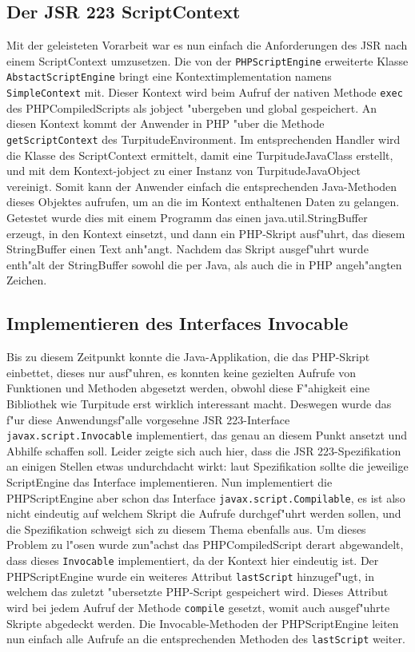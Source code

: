 \subsection{Der JSR 223 ScriptContext}
\label{sec:chap1:impl:9}

Mit der geleisteten Vorarbeit war es nun einfach die Anforderungen des JSR nach einem ScriptContext umzusetzen. Die von der \texttt{PHPScriptEngine} erweiterte Klasse
\texttt{AbstactScriptEngine} bringt eine Kontextimplementation namens \texttt{SimpleContext} mit. Dieser Kontext wird beim Aufruf der nativen Methode \texttt{exec} des PHPCompiledScripts
als jobject "ubergeben und global gespeichert. An diesen Kontext kommt der Anwender in PHP "uber die Methode \texttt{getScriptContext} des TurpitudeEnvironment. Im 
entsprechenden Handler wird die Klasse des ScriptContext ermittelt, damit eine TurpitudeJavaClass erstellt, und mit dem Kontext-jobject zu einer Instanz von
TurpitudeJavaObject vereinigt. Somit kann der Anwender einfach die entsprechenden Java-Methoden dieses Objektes aufrufen, um an die im Kontext enthaltenen Daten zu
gelangen. Getestet wurde dies mit einem Programm das einen java.util.StringBuffer erzeugt, in den Kontext einsetzt, und dann ein PHP-Skript ausf"uhrt, das diesem
StringBuffer einen Text anh"angt. Nachdem das Skript ausgef"uhrt wurde enth"alt der StringBuffer sowohl die per Java, als auch die in PHP angeh"angten Zeichen.

\subsection{Implementieren des Interfaces Invocable}
\label{sec:chap1:impl:10}

Bis zu diesem Zeitpunkt konnte die Java-Applikation, die das PHP-Skript einbettet, dieses nur ausf"uhren, es konnten keine gezielten Aufrufe von Funktionen und Methoden
abgesetzt werden, obwohl diese F"ahigkeit eine Bibliothek wie Turpitude erst wirklich interessant macht. Deswegen wurde das f"ur diese Anwendungsf"alle vorgesehne
JSR 223-Interface \texttt{javax.script.Invocable}
implementiert, das genau an diesem Punkt ansetzt und Abhilfe schaffen soll. Leider zeigte sich auch hier, dass die JSR 223-Spezifikation an einigen Stellen
etwas undurchdacht wirkt: laut Spezifikation sollte die jeweilige ScriptEngine das Interface implementieren. Nun implementiert die PHPScriptEngine aber schon
das Interface \texttt{javax.script.Compilable}, es ist also nicht eindeutig auf welchem Skript die Aufrufe durchgef"uhrt werden sollen, und die Spezifikation schweigt
sich zu diesem Thema ebenfalls aus. Um dieses Problem zu l"osen wurde zun"achst das PHPCompiledScript derart abgewandelt, dass dieses \texttt{Invocable} implementiert,
da der Kontext hier eindeutig ist. Der PHPScriptEngine wurde ein weiteres Attribut \texttt{lastScript} hinzugef"ugt, in welchem das zuletzt "ubersetzte 
PHP-Script gespeichert wird. Dieses Attribut wird bei jedem Aufruf der Methode \texttt{compile} gesetzt, womit auch ausgef"uhrte Skripte abgedeckt werden.
Die Invocable-Methoden der PHPScriptEngine leiten nun einfach alle Aufrufe an die entsprechenden Methoden des \texttt{lastScript} weiter.

